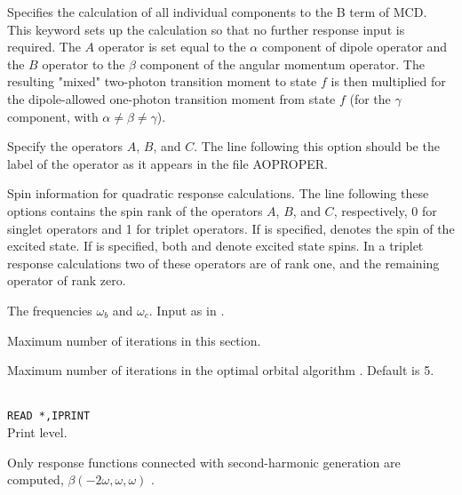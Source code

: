 \begin{description}
\item{}
Specifies the calculation of all individual components to the 
B term of MCD.
This keyword sets up the calculation so that no further response input is required. 
The $A$ operator is set equal to the $\alpha$ component of dipole 
operator and
the $B$ operator to the $\beta$ component of the angular momentum
operator. The resulting "mixed" two-photon transition moment to state $f$ 
is then multiplied for the dipole-allowed one-photon transition moment 
from state $f$ (for the $\gamma$ component, with $\alpha \neq \beta \neq \gamma$).
\cite{ourmcd} 

\item[\Key{APROP}, \Key{BPROP}, \Key{CPROP}]
Specify the operators $A$, $B$, and $C$. The line following this
option should be the label of the operator as it appears in the file
AOPROPER.

\item[\Key{ASPIN}, \Key{BSPIN}, \Key{CSPIN}]
Spin information for quadratic response calculations.
The line following these options contains the spin rank of the operators 
$A$, $B$, and $C$, respectively, 0 for singlet operators and 1 for triplet
operators. If  is specified,  denotes the
spin of the excited state. If  is specified,
both  and  denote excited state spins.
In a triplet response calculations two of these operators are of rank one,
and the remaining operator of rank zero.


\item[\Key{BFREQ}, \Key{CFREQ}]
The frequencies $\omega_b$ and $\omega_c$. Input as in
.

\item{}
Maximum number of iterations in this section.

\item{}
Maximum number of iterations in the optimal orbital algorithm 
\cite{tuhjahjajpjjcp84}. 
Default is 5.

\item{}\\
\verb|READ *,IPRINT|\\
Print level.

\item{}
Only response functions connected with second-harmonic
generation 
are computed, $\beta(-2\omega,\omega,\omega)$ .


\end{description}
